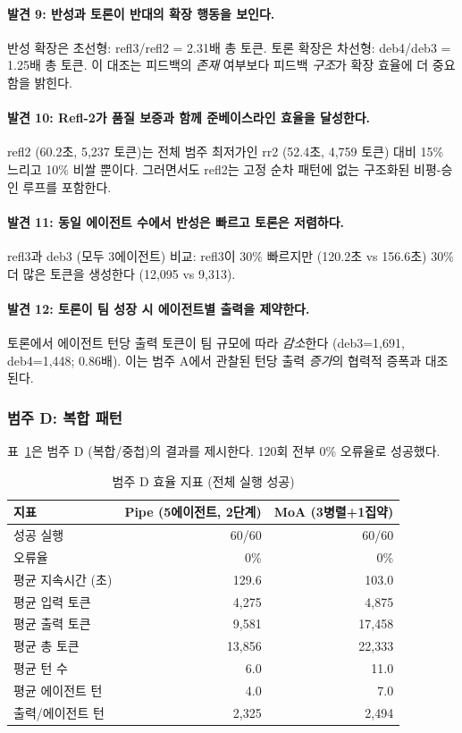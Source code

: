 \paragraph{발견 9: 반성과 토론이 반대의 확장 행동을 보인다.}
반성 확장은 초선형: refl3/refl2 = 2.31배 총 토큰. 토론 확장은 차선형: deb4/deb3 = 1.25배 총 토큰. 이 대조는 피드백의 \emph{존재} 여부보다 피드백 \emph{구조}가 확장 효율에 더 중요함을 밝힌다.

\paragraph{발견 10: Refl-2가 품질 보증과 함께 준베이스라인 효율을 달성한다.}
refl2 (60.2초, 5,237 토큰)는 전체 범주 최저가인 rr2 (52.4초, 4,759 토큰) 대비 15\% 느리고 10\% 비쌀 뿐이다. 그러면서도 refl2는 고정 순차 패턴에 없는 구조화된 비평-승인 루프를 포함한다.

\paragraph{발견 11: 동일 에이전트 수에서 반성은 빠르고 토론은 저렴하다.}
refl3과 deb3 (모두 3에이전트) 비교: refl3이 30\% 빠르지만 (120.2초 vs 156.6초) 30\% 더 많은 토큰을 생성한다 (12,095 vs 9,313).

\paragraph{발견 12: 토론이 팀 성장 시 에이전트별 출력을 제약한다.}
토론에서 에이전트 턴당 출력 토큰이 팀 규모에 따라 \emph{감소}한다 (deb3=1,691, deb4=1,448; 0.86배). 이는 범주 A에서 관찰된 턴당 출력 \emph{증가}의 협력적 증폭과 대조된다.

\subsubsection{범주 D: 복합 패턴}

표~\ref{tab:cat-d}은 범주 D (복합/중첩)의 결과를 제시한다. 120회 전부 0\% 오류율로 성공했다.

\begin{table}[H]
\centering
\caption{범주 D 효율 지표 (전체 실행 성공)}
\label{tab:cat-d}
{\small
\begin{tabular}{lrr}
\toprule
지표 & Pipe (5에이전트, 2단계) & MoA (3병렬+1집약) \\
\midrule
성공 실행       & 60/60 & 60/60 \\
오류율           & 0\% & 0\% \\
평균 지속시간 (초) & 129.6 & 103.0 \\
평균 입력 토큰   & 4,275 & 4,875 \\
평균 출력 토큰   & 9,581 & 17,458 \\
평균 총 토큰     & 13,856 & 22,333 \\
평균 턴 수       & 6.0 & 11.0 \\
평균 에이전트 턴 & 4.0 & 7.0 \\
출력/에이전트 턴 & 2,325 & 2,494 \\
\bottomrule
\end{tabular}
}
\end{table}


